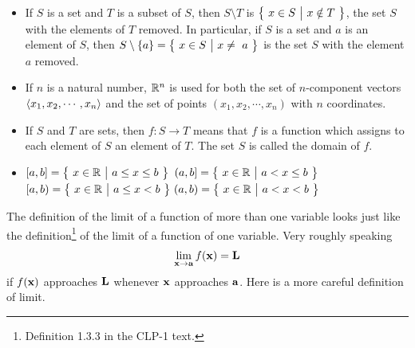 \addtocounter{theorem}{-1}
\begin{notn}[continued]
\begin{itemize}
\item
If $S$ is a set and $T$ is a subset of $S$, then $S\setminus T$
 is $\big\{ \ x\in S\ \big|\ x\notin T\ \big\}$, the set $S$ with the elements of $T$ removed.
In particular, if  $S$ is a set and $a$ is an element of $S$, 
then $S\setminus\{a\}=\Set{x\in S}{x\ne\ a}$ is the set $S$ with the element $a$ removed.
\item
If $n$ is a natural number, $\mathbb{R}^n$ is used for both the 
set of $n$-component vectors  $\left< x_1,x_2,\cdots,x_n \right>$ and 
the set of  points $(x_1,x_2,\cdots,x_n)$ with $n$ coordinates.
\item
If $S$ and $T$ are sets, then $f:S\rightarrow T$ means that
$f$ is a function which assigns to each element of $S$ an element of $T$.
The set $S$ is called the domain of $f$.
\item
 $[a,b]=\big\{ \ x\in\mathbb{R}\ \big|\ a\le x\le b\ \big\}$ \qquad
 $(a,b]=\big\{ \ x\in\mathbb{R}\ \big|\ a< x\le b\ \big\}$ \\
 $[a,b)=\big\{ \ x\in\mathbb{R}\ \big|\ a\le x< b\ \big\}$ \qquad
 $\!(a,b)=\big\{ \ x\in\mathbb{R}\ \big|\ a< x< b\ \big\}$

\end{itemize}
\end{notn}


The definition of the limit of a function of more than one
variable looks just like the 
definition\footnote{Definition 1.3.3 in the CLP-1 text.}
of the limit of a function of one variable. 
Very roughly speaking
\begin{align*}
  \lim_{\mathbf{x}\to \mathbf{a}} f(\mathbf{x}) = \mathbf{L}
\end{align*}
if $f(\mathbf{x})$ approaches  $\mathbf{L}$ whenever $\mathbf{x}$ approaches $\mathbf{a}$.
Here is a more careful definition of limit.

